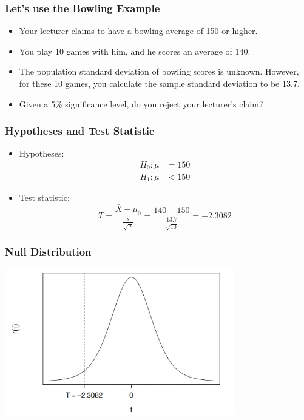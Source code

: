\documentclass[14pt]{beamer}
\begin{document}
\begin{frame}
	\frametitle{Let's use the Bowling Example}
	
	\begin{itemize}[label={\color{blue}$\blacktriangleright$}]
		\item Your lecturer claims to have a bowling average of 150 or higher.
		
		\item You play 10 games with him, and he scores an average of 140.
		
		\item The population standard deviation of bowling scores is unknown. However, for these 10 games, you calculate the sample standard deviation to be 13.7.
		
		\item Given a 5\% significance level, do you reject your lecturer's claim?
	\end{itemize}
	
\end{frame}
\begin{frame}
	\frametitle{Hypotheses and Test Statistic}
	
	\begin{itemize}[label={\color{blue}$\blacktriangleright$}]
		\item Hypotheses:
		\[
		\begin{aligned}
			H_0 : \mu &= 150 \\
			H_1 : \mu &< 150
		\end{aligned}
		\]
		
		\item Test statistic:
		\[
		T = \frac{\bar{X} - \mu_0}{\frac{s}{\sqrt{n}}} = \frac{140 - 150}{\frac{13.7}{\sqrt{10}}} = -2.3082
		\]
	\end{itemize}
	
\end{frame}
\begin{frame}
	\frametitle{Null Distribution}
	\centering
	\includegraphics[width=10cm]{nullt.png}	
\end{frame}
\end{document}
